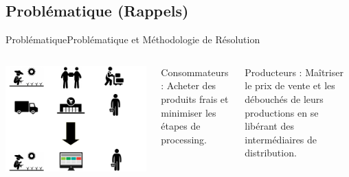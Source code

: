 \documentclass[usenames,dvipsnames]{beamer}
\begin{document}
\subsection{Problématique (Rappels)}
\begin{frame}{Problématique}{Problématique et Méthodologie de Résolution}
\begin{columns}[onlytextwidth, T]
  \column{55mm}
    \includegraphics[scale=0.2]{images/chain_production.png}

  \column{\dimexpr\linewidth-40mm-2mm}
    \begin{block}{Consommateurs :}
    Acheter des produits frais et minimiser les étapes de processing.
    \end{block}

    \begin{block}{Producteurs :}
      Maîtriser le prix de vente et les débouchés de leurs productions en se libérant des intermédiaires de distribution.
    \end{block}
\end{columns}
\end{frame}
\end{document}
